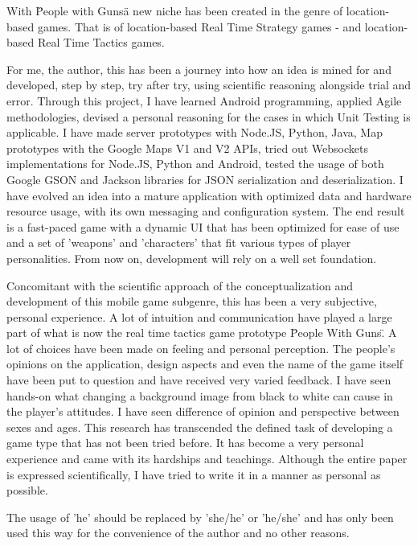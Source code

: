 With \"People with Guns\" a new niche has been created in the genre of
location-based games. That is of location-based Real Time Strategy games - and
location-based Real Time Tactics games.\newline

For me, the author, this has been a journey into how an idea is mined for and
developed, step by step, try after try, using scientific reasoning
alongside trial and error. Through this project, I have learned Android
programming, applied Agile methodologies, devised a personal reasoning for the
cases in which Unit Testing is applicable. I have made server prototypes with
Node.JS, Python, Java, Map prototypes with the Google Maps V1 and V2 APIs, tried
out Websockets implementations for Node.JS, Python and Android, tested the usage
of both Google GSON and Jackson libraries for JSON serialization and
deserialization. I have evolved an idea into a mature application with optimized
data and hardware resource usage, with its own messaging and configuration
system. The end result is a fast-paced game with a dynamic UI that has been
optimized for ease of use and a set of 'weapons' and 'characters' that fit
various types of player personalities. From now on, development will rely on a
well set foundation.\newline


Concomitant with the scientific approach of the conceptualization and
development of this mobile game subgenre, this has been a very subjective,
personal experience. A lot of intuition and communication have played a large
part of what is now the real time tactics game prototype \"People With Guns\" .
A lot of choices have been made on feeling and personal perception. The people's
opinions on the application, design aspects and even the name of the game itself
have been put to question and have received very varied feedback. I have seen
hands-on what changing a background image from black to white can cause in the
player's attitudes. I have seen difference of opinion and perspective between
sexes and ages. This research has transcended the defined task of developing a
game type that has not been tried before. It has become a very personal
experience and came with its hardships and teachings. Although the entire paper
is expressed scientifically, I have tried to write it in a manner as personal as
possible.\newline

The usage of 'he' should be replaced by 'she/he' or 'he/she' and has only been
used this way for the convenience of the author and no other reasons.
